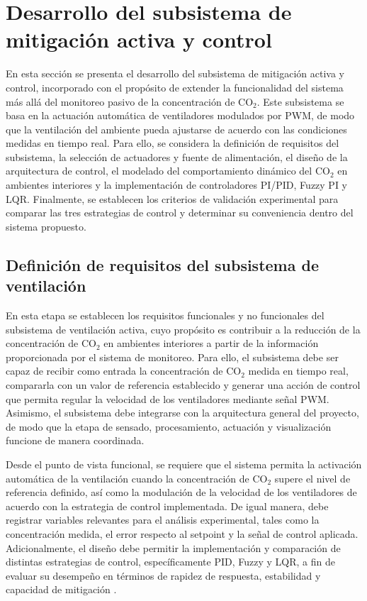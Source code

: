 \section{Desarrollo del subsistema de mitigación activa y control}
En esta sección se presenta el desarrollo del subsistema de mitigación activa y control, incorporado con el propósito de extender la funcionalidad del sistema más allá del monitoreo pasivo de la concentración de CO$_2$. Este subsistema se basa en la actuación automática de ventiladores modulados por PWM, de modo que la ventilación del ambiente pueda ajustarse de acuerdo con las condiciones medidas en tiempo real. Para ello, se considera la definición de requisitos del subsistema, la selección de actuadores y fuente de alimentación, el diseño de la arquitectura de control, el modelado del comportamiento dinámico del CO$_2$ en ambientes interiores y la implementación de controladores PI/PID, Fuzzy PI y LQR. Finalmente, se establecen los criterios de validación experimental para comparar las tres estrategias de control y determinar su conveniencia dentro del sistema propuesto.




\subsection{Definición de requisitos del subsistema de ventilación}

En esta etapa se establecen los requisitos funcionales y no funcionales del subsistema de ventilación activa, cuyo propósito es contribuir a la reducción de la concentración de CO$_2$ en ambientes interiores a partir de la información proporcionada por el sistema de monitoreo. Para ello, el subsistema debe ser capaz de recibir como entrada la concentración de CO$_2$ medida en tiempo real, compararla con un valor de referencia establecido y generar una acción de control que permita regular la velocidad de los ventiladores mediante señal PWM. Asimismo, el subsistema debe integrarse con la arquitectura general del proyecto, de modo que la etapa de sensado, procesamiento, actuación y visualización funcione de manera coordinada.

Desde el punto de vista funcional, se requiere que el sistema permita la activación automática de la ventilación cuando la concentración de CO$_2$ supere el nivel de referencia definido, así como la modulación de la velocidad de los ventiladores de acuerdo con la estrategia de control implementada. De igual manera, debe registrar variables relevantes para el análisis experimental, tales como la concentración medida, el error respecto al setpoint y la señal de control aplicada. Adicionalmente, el diseño debe permitir la implementación y comparación de distintas estrategias de control, específicamente PID, Fuzzy y LQR, a fin de evaluar su desempeño en términos de rapidez de respuesta, estabilidad y capacidad de mitigación \cite{emmerich_persily_2001, delwati_2018, predictive_ventilation_iot_2023}.

